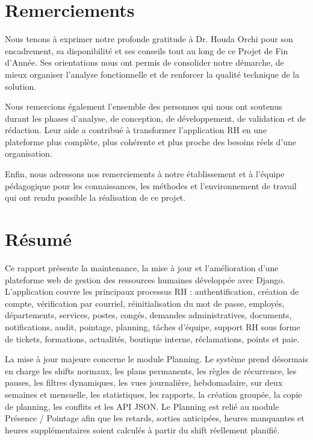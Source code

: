 \documentclass[12pt,a4paper]{report}
\begin{document}



\chapter*{Remerciements}
Nous tenons à exprimer notre profonde gratitude à Dr. Houda Orchi pour son encadrement, sa disponibilité et ses conseils tout au long de ce Projet de Fin d'Année. Ses orientations nous ont permis de consolider notre démarche, de mieux organiser l'analyse fonctionnelle et de renforcer la qualité technique de la solution.

Nous remercions également l'ensemble des personnes qui nous ont soutenus durant les phases d'analyse, de conception, de développement, de validation et de rédaction. Leur aide a contribué à transformer l'application RH en une plateforme plus complète, plus cohérente et plus proche des besoins réels d'une organisation.

Enfin, nous adressons nos remerciements à notre établissement et à l'équipe pédagogique pour les connaissances, les méthodes et l'environnement de travail qui ont rendu possible la réalisation de ce projet.
\newpage

\chapter*{Résumé}
Ce rapport présente la maintenance, la mise à jour et l'amélioration d'une plateforme web de gestion des ressources humaines développée avec Django. L'application couvre les principaux processus RH : authentification, création de compte, vérification par courriel, réinitialisation du mot de passe, employés, départements, services, postes, congés, demandes administratives, documents, notifications, audit, pointage, planning, tâches d'équipe, support RH sous forme de tickets, formations, actualités, boutique interne, réclamations, points et paie.

La mise à jour majeure concerne le module Planning. Le système prend désormais en charge les shifts normaux, les plans permanents, les règles de récurrence, les pauses, les filtres dynamiques, les vues journalière, hebdomadaire, sur deux semaines et mensuelle, les statistiques, les rapports, la création groupée, la copie de planning, les conflits et les API JSON. Le Planning est relié au module Présence / Pointage afin que les retards, sorties anticipées, heures manquantes et heures supplémentaires soient calculés à partir du shift réellement planifié.
\end{document}
